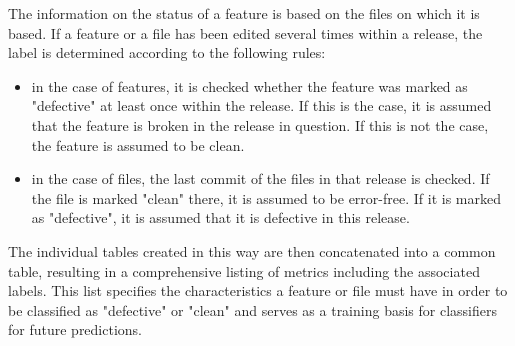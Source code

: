 \begin{table}[H]
\centering
{}
\end{table}

The information on the status of a feature is based on the files on which it is based. If a feature or a file has been edited several times within a release, the label is determined according to the following rules:

\begin{itemize}
\setlength{\itemsep}{-2pt}
\item in the case of features, it is checked whether the feature was marked as "defective" at least once within the release. If this is the case, it is assumed that the feature is broken in the release in question. If this is not the case, the feature is assumed to be clean.
\item in the case of files, the last commit of the files in that release is checked. If the file is marked "clean" there, it is assumed to be error-free. If it is marked as "defective", it is assumed that it is defective in this release.
\end{itemize}

The individual tables created in this way are then concatenated into a common table, resulting in a comprehensive listing of metrics including the associated labels. This list specifies the characteristics a feature or file must have in order to be classified as "defective" or "clean" and serves as a training basis for classifiers for future predictions.

